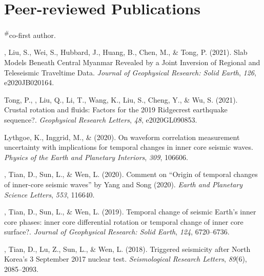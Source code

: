 \newcommand{\CS}{*} %
\newcommand{\CF}{\textsuperscript{\#}} %

\section*{Peer-reviewed Publications}
\CF co-first author.

\begin{etaremune}
\item
    \Yao, Liu, S., Wei, S., Hubbard, J., Huang, B., Chen, M., \& Tong, P. (2021).
    Slab Models Beneath Central Myanmar Revealed by a Joint Inversion of Regional and Teleseismic Traveltime Data.
    \textit{Journal of Geophysical Research: Solid Earth}, \textit{126}, e2020JB020164.
\item
    Tong, P., \Yao, Liu, Q., Li, T., Wang, K., Liu, S., Cheng, Y., \& Wu, S. (2021).
    Crustal rotation and fluids: Factors for the 2019 Ridgecrest earthquake sequence?.
    \textit{Geophysical Research Letters}, \textit{48}, e2020GL090853.
\item
    Lythgoe, K., Inggrid, M., \& \Yao (2020).
    On waveform correlation measurement uncertainty with implications for temporal changes in inner core seismic waves.
    \textit{Physics of the Earth and Planetary Interiors}, \textit{309}, 106606.
\item
    \Yao, Tian, D., Sun, L., \& Wen, L. (2020).
    Comment on “Origin of temporal changes of inner-core seismic waves” by Yang and Song (2020).
    \textit{Earth and Planetary Science Letters}, \textit{553}, 116640.
\item
    \Yao, Tian, D., Sun, L., \& Wen, L. (2019).
    Temporal change of seismic Earth’s inner core phases: inner core differential rotation or temporal change of inner core surface?.
    \textit{Journal of Geophysical Research: Solid Earth}, \textit{124}, 6720--6736.
\item
    \Yao, Tian, D., Lu, Z., Sun, L., \& Wen, L. (2018).
    Triggered seismicity after North Korea's 3 September 2017 nuclear test.
    \textit{Seismological Research Letters}, \textit{89}(6), 2085--2093.
\item

\end{etaremune}
